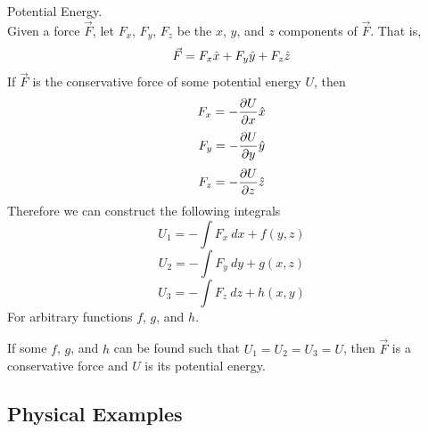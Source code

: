 \documentclass[11pt]{article}
\theoremstyle{gangnamstyle}{\newtheorem{definition}{Definition}[]}
\theoremstyle{gangnamstyle}{\newtheorem{example}{Example}[]}
\theoremstyle{gangnamstyle}{\newtheorem{problem}{Problem}[]}
\begin{document}
\begin{definition}
Potential Energy. \\
Given a force $\Vec{F}$, let $F_x$, $F_y$, $F_z$ be the $x$, $y$, and $z$ components of $\Vec{F}$. That is, 
\[ \Vec{F} = F_x\Hat{x} + F_y\Hat{y} + F_z\Hat{z} \]
If $\Vec{F}$ is the conservative force of some potential energy $U$, then
\begin{equation}
F_x = - \frac{\partial U}{\partial x}\Hat{x}
\end{equation}
\begin{equation}
F_y = - \frac{\partial U}{\partial y}\Hat{y}
\end{equation}
\begin{equation}
F_z = - \frac{\partial U}{\partial z}\Hat{z}
\end{equation}
Therefore we can construct the following integrals
\begin{equation}
U_1 = - \int F_x \ dx + f(y, z)
\end{equation}
\begin{equation}
U_2 = - \int F_y \ dy + g(x, z)
\end{equation}
\begin{equation}
U_3 = - \int F_z \ dz + h(x, y)
\end{equation}
For arbitrary functions $f$, $g$, and $h$. 

If some $f$, $g$, and $h$ can be found such that $U_1 = U_2 = U_3 = U$, then $\Vec{F}$ is a conservative force and $U$ is its potential energy. 
\end{definition}

\subsection{Physical Examples}
\end{document}
